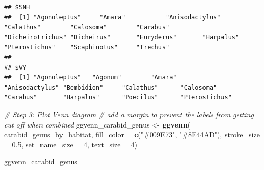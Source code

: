 \documentclass[
]{article}
\newenvironment{Shaded}{\begin{snugshade}}{\end{snugshade}}
\newcommand{\AttributeTok}[1]{\textcolor[rgb]{0.13,0.29,0.53}{#1}}
\newcommand{\CommentTok}[1]{\textcolor[rgb]{0.56,0.35,0.01}{\textit{#1}}}
\newcommand{\ConstantTok}[1]{\textcolor[rgb]{0.56,0.35,0.01}{#1}}
\newcommand{\ControlFlowTok}[1]{\textcolor[rgb]{0.13,0.29,0.53}{\textbf{#1}}}
\newcommand{\DecValTok}[1]{\textcolor[rgb]{0.00,0.00,0.81}{#1}}
\newcommand{\FloatTok}[1]{\textcolor[rgb]{0.00,0.00,0.81}{#1}}
\newcommand{\FunctionTok}[1]{\textcolor[rgb]{0.13,0.29,0.53}{\textbf{#1}}}
\newcommand{\NormalTok}[1]{#1}
\newcommand{\OtherTok}[1]{\textcolor[rgb]{0.56,0.35,0.01}{#1}}
\newcommand{\SpecialCharTok}[1]{\textcolor[rgb]{0.81,0.36,0.00}{\textbf{#1}}}
\newcommand{\StringTok}[1]{\textcolor[rgb]{0.31,0.60,0.02}{#1}}
\begin{document}
\begin{Shaded}
\end{Shaded}

\begin{verbatim}
## $SNH
##  [1] "Agonoleptus"     "Amara"           "Anisodactylus"   "Calathus"        "Calosoma"        "Carabus"         "Dicheirotrichus" "Dicheirus"       "Euryderus"       "Harpalus"        "Pterostichus"    "Scaphinotus"     "Trechus"        
## 
## $VY
##  [1] "Agonoleptus"   "Agonum"        "Amara"         "Anisodactylus" "Bembidion"     "Calathus"      "Calosoma"      "Carabus"       "Harpalus"      "Poecilus"      "Pterostichus"
\end{verbatim}

\begin{Shaded}
\begin{Highlighting}[]
\CommentTok{\# Step 3: Plot Venn diagram}
\CommentTok{\# add a margin to prevent the labels from getting cut off when combined}
\NormalTok{ggvenn\_carabid\_genus }\OtherTok{\textless{}{-}} \FunctionTok{ggvenn}\NormalTok{(}
\NormalTok{  carabid\_genus\_by\_habitat,}
  \AttributeTok{fill\_color =} \FunctionTok{c}\NormalTok{(}\StringTok{"\#009E73"}\NormalTok{, }\StringTok{"\#8E44AD"}\NormalTok{),}
  \AttributeTok{stroke\_size =} \FloatTok{0.5}\NormalTok{,}
  \AttributeTok{set\_name\_size =} \DecValTok{4}\NormalTok{,}
  \AttributeTok{text\_size =} \DecValTok{4}\NormalTok{)}

\NormalTok{ggvenn\_carabid\_genus}
\end{Highlighting}
\end{Shaded}
\end{document}
